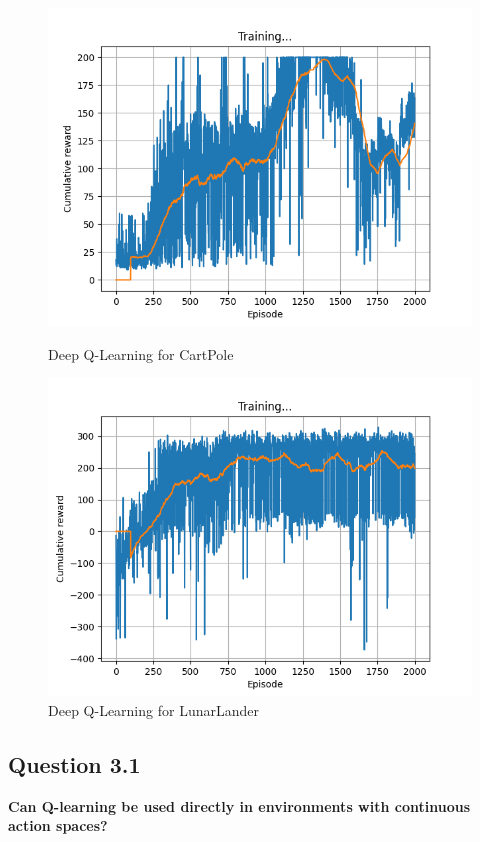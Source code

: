 \documentclass[12pt]{article}
\begin{document}
\begin{figure}[H]
    \centering
   \begin{minipage}{0.48\textwidth}
     \centering
     \includegraphics[width=0.9\linewidth]{exercise-4/plots/task-4a.png}
     \caption{Deep Q-Learning for CartPole}
     \label{fig:task-2-1}
   \end{minipage}\hfill
   \begin{minipage}{0.48\textwidth}
     \centering
     \includegraphics[width=0.9\linewidth]{exercise-4/plots/task-4b.png}
     \caption{Deep Q-Learning for LunarLander}
     \label{fig:task-2-2}
   \end{minipage}
\end{figure}

\subsection{Question 3.1}
\textbf{Can Q-learning be used directly in environments with continuous action spaces?}\\
\end{document}

